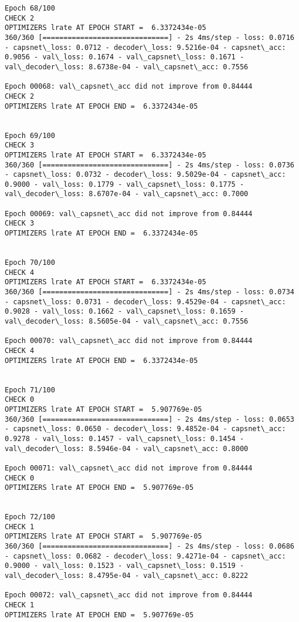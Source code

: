 \documentclass[11pt]{article}
\begin{document}
\begin{Verbatim}[commandchars=\\\{\}]
Epoch 68/100
CHECK 2
OPTIMIZERS lrate AT EPOCH START =  6.3372434e-05
360/360 [==============================] - 2s 4ms/step - loss: 0.0716 - capsnet\_loss: 0.0712 - decoder\_loss: 9.5216e-04 - capsnet\_acc: 0.9056 - val\_loss: 0.1674 - val\_capsnet\_loss: 0.1671 - val\_decoder\_loss: 8.6738e-04 - val\_capsnet\_acc: 0.7556

Epoch 00068: val\_capsnet\_acc did not improve from 0.84444
CHECK 2
OPTIMIZERS lrate AT EPOCH END =  6.3372434e-05 


Epoch 69/100
CHECK 3
OPTIMIZERS lrate AT EPOCH START =  6.3372434e-05
360/360 [==============================] - 2s 4ms/step - loss: 0.0736 - capsnet\_loss: 0.0732 - decoder\_loss: 9.5029e-04 - capsnet\_acc: 0.9000 - val\_loss: 0.1779 - val\_capsnet\_loss: 0.1775 - val\_decoder\_loss: 8.6707e-04 - val\_capsnet\_acc: 0.7000

Epoch 00069: val\_capsnet\_acc did not improve from 0.84444
CHECK 3
OPTIMIZERS lrate AT EPOCH END =  6.3372434e-05 


Epoch 70/100
CHECK 4
OPTIMIZERS lrate AT EPOCH START =  6.3372434e-05
360/360 [==============================] - 2s 4ms/step - loss: 0.0734 - capsnet\_loss: 0.0731 - decoder\_loss: 9.4529e-04 - capsnet\_acc: 0.9028 - val\_loss: 0.1662 - val\_capsnet\_loss: 0.1659 - val\_decoder\_loss: 8.5605e-04 - val\_capsnet\_acc: 0.7556

Epoch 00070: val\_capsnet\_acc did not improve from 0.84444
CHECK 4
OPTIMIZERS lrate AT EPOCH END =  6.3372434e-05 


Epoch 71/100
CHECK 0
OPTIMIZERS lrate AT EPOCH START =  5.907769e-05
360/360 [==============================] - 2s 4ms/step - loss: 0.0653 - capsnet\_loss: 0.0650 - decoder\_loss: 9.4852e-04 - capsnet\_acc: 0.9278 - val\_loss: 0.1457 - val\_capsnet\_loss: 0.1454 - val\_decoder\_loss: 8.5946e-04 - val\_capsnet\_acc: 0.8000

Epoch 00071: val\_capsnet\_acc did not improve from 0.84444
CHECK 0
OPTIMIZERS lrate AT EPOCH END =  5.907769e-05 


Epoch 72/100
CHECK 1
OPTIMIZERS lrate AT EPOCH START =  5.907769e-05
360/360 [==============================] - 2s 4ms/step - loss: 0.0686 - capsnet\_loss: 0.0682 - decoder\_loss: 9.4271e-04 - capsnet\_acc: 0.9000 - val\_loss: 0.1523 - val\_capsnet\_loss: 0.1519 - val\_decoder\_loss: 8.4795e-04 - val\_capsnet\_acc: 0.8222

Epoch 00072: val\_capsnet\_acc did not improve from 0.84444
CHECK 1
OPTIMIZERS lrate AT EPOCH END =  5.907769e-05 



\end{Verbatim}
\end{document}
